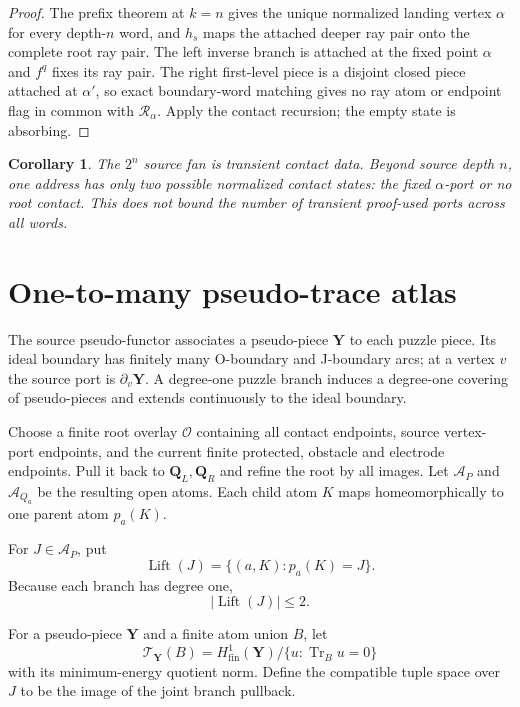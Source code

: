 \documentclass[11pt]{article}
\newtheorem{corollary}[theorem]{Corollary}
\theoremstyle{definition}
\theoremstyle{remark}
\newcommand{\T}{\mathcal T}
\begin{document}
\begin{proof}
The prefix theorem at $k=n$ gives the unique normalized landing vertex
$\alpha$ for every depth-$n$ word, and $h_s$ maps the attached deeper ray pair
onto the complete root ray pair.  The left inverse branch is attached at the
fixed point $\alpha$ and $f^q$ fixes its ray pair.  The right first-level piece
is a disjoint closed piece attached at $\alpha'$, so exact boundary-word
matching gives no ray atom or endpoint flag in common with
$\mathscr R_\alpha$.  Apply the contact recursion; the empty state is
absorbing.
\end{proof}

\begin{corollary}
The $2^n$ source fan is transient contact data.  Beyond source depth $n$, one
address has only two possible normalized contact states: the fixed
$\alpha$-port or no root contact.  This does not bound the number of transient
proof-used ports across all words.
\end{corollary}

\section{One-to-many pseudo-trace atlas}
The source pseudo-functor associates a pseudo-piece $\mathbf Y$ to each puzzle
piece.  Its ideal boundary has finitely many O-boundary and J-boundary arcs; at
a vertex $v$ the source port is $\partial_v\mathbf Y$.  A degree-one puzzle
branch induces a degree-one covering of pseudo-pieces and extends continuously
to the ideal boundary.

Choose a finite root overlay $\mathscr O$ containing all contact endpoints,
source vertex-port endpoints, and the current finite protected, obstacle and
electrode endpoints.  Pull it back to $\mathbf Q_L,\mathbf Q_R$ and refine the
root by all images.  Let $\mathscr A_P$ and $\mathscr A_{Q_a}$ be the resulting
open atoms.  Each child atom $K$ maps homeomorphically to one parent atom
$p_a(K)$.

For $J\in\mathscr A_P$, put
\[
 \operatorname{Lift}(J)=\{(a,K):p_a(K)=J\}.
\]
Because each branch has degree one,
\[
 |\operatorname{Lift}(J)|\le2.
\]

For a pseudo-piece $\mathbf Y$ and a finite atom union $B$, let
\[
 \T_{\mathbf Y}(B)
 =H^1_{\mathrm{fin}}(\mathbf Y)/\{u:\operatorname{Tr}_B u=0\}
\]
with its minimum-energy quotient norm.  Define the compatible tuple space over
$J$ to be the image of the joint branch pullback.
\end{document}
